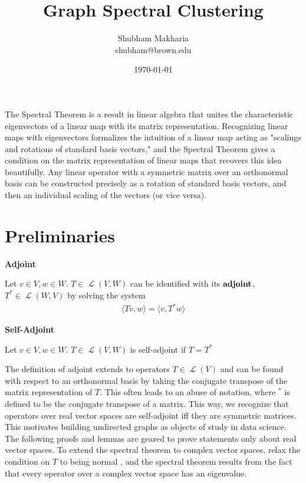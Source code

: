 \documentclass[letterpaper,12pt]{article}
\newcommand{\langlerangle}[1]{\langle{#1}\rangle}
\newcommand{\linearoperator}[1]{\operatorname{\mathcal{L}}(#1)}
\newcommand{\an}[1]{{\leavevmode\color{red}{#1}}}
\begin{document}
\title{Graph Spectral Clustering}
\author{Shubham Makharia \\shubham@brown.edu}
\date{\today}
\maketitle
The Spectral Theorem is a result in linear algebra that unites the characteristic eigenvectors of a linear map with its matrix representation. Recognizing linear maps with eigenvectors formalizes the intuition of a linear map acting as "scalings and rotations of standard basis vectors," and the Spectral Theorem gives a condition on the matrix representation of linear maps that recovers this idea beautifully. Any linear operator with a symmetric matrix over an orthonormal basis can be constructed precisely as a rotation of standard basis vectors, and then an individual scaling of the vectors (or vice versa). 

\section*{Preliminaries}

\noindent
\textbf{Adjoint}

\noindent
Let $v \in V, w \in W$. $T \in \linearoperator{V,W}$ can be identified with its $\bf{adjoint}$, $T^* \in \linearoperator{W,V}$ by solving the system
\begin{align}
    \langlerangle{Tv,w}=\langlerangle{v,T^{*}w}
\end{align}
\an{What is $V$? $W$? What does $\linearoperator{\cdot,\cdot}$ mean? What is $\left\langle \cdot, \cdot \right\rangle$?}

\noindent
\textbf{Self-Adjoint}

\noindent
Let $v \in V, w \in W$. $T \in \linearoperator{V,W}$ is self-adjoint if $ T=T^*$


\noindent The definition of adjoint extends to operators $T \in \linearoperator{V}$ and can be found with respect to an orthonormal basis by taking the conjugate transpose of the matrix representation of $T$. \an{The previous sentence doesn't really make sense to me. ``can be found with respect to an orthonormal basis"?}This often leads to an abuse of notation, where $^{*}$ is defined to be the conjugate transpose of a matrix. This way, we recognize that operators over real vector spaces are self-adjoint iff they are symmetric matrices. This motivates building undirected graphs as objects of study in data science. \an{Well, you haven't motivated this yet; graphs have nothing to do with anything yet.} The following proofs and lemmas are geared to prove statements only about real vector spaces. To extend the spectral theorem to complex vector spaces, relax the condition on $T$ to being normal \an{(The complex-valued analogue of a real symmetric matrix is a normal one?}, and the spectral theorem results from the fact that every operator over a complex vector space has an eigenvalue.\an{I don't really think it follows form this fact.}
\end{document}
